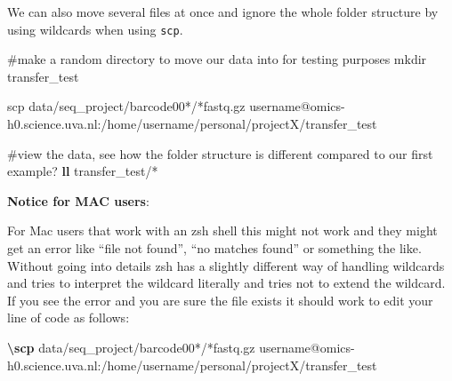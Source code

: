 \documentclass[
  letterpaper,
  DIV=11,
  numbers=noendperiod]{scrreprt}
\newenvironment{Shaded}{}{}
\newcommand{\CommentTok}[1]{\textcolor[rgb]{0.42,0.45,0.49}{#1}}
\newcommand{\ExtensionTok}[1]{\textcolor[rgb]{0.84,0.23,0.29}{\textbf{#1}}}
\newcommand{\FunctionTok}[1]{\textcolor[rgb]{0.44,0.26,0.76}{#1}}
\newcommand{\NormalTok}[1]{\textcolor[rgb]{0.14,0.16,0.18}{#1}}
\newcommand{\PreprocessorTok}[1]{\textcolor[rgb]{0.84,0.23,0.29}{#1}}
\begin{document}
\begin{tcolorbox}[enhanced jigsaw, coltitle=black, leftrule=.75mm, colback=white, toptitle=1mm, breakable, toprule=.15mm, colbacktitle=quarto-callout-tip-color!10!white, bottomtitle=1mm, arc=.35mm, opacitybacktitle=0.6, bottomrule=.15mm, titlerule=0mm, title=\textcolor{quarto-callout-tip-color}{\faLightbulb}\hspace{0.5em}{Tip: moving data from the HPC using wildcards}, rightrule=.15mm, left=2mm, colframe=quarto-callout-tip-color-frame, opacityback=0]

We can also move several files at once and ignore the whole folder
structure by using wildcards when using \texttt{scp}.

\begin{Shaded}
\begin{Highlighting}[]
\CommentTok{\#make a random directory to move our data into for testing purposes}
\FunctionTok{mkdir}\NormalTok{ transfer\_test}

\FunctionTok{scp}\NormalTok{ data/seq\_project/barcode00}\PreprocessorTok{*}\NormalTok{/}\PreprocessorTok{*}\NormalTok{fastq.gz username@omics{-}h0.science.uva.nl:/home/username/personal/projectX/transfer\_test}

\CommentTok{\#view the data, see how the folder structure is different compared to our first example? }
\ExtensionTok{ll}\NormalTok{ transfer\_test/}\PreprocessorTok{*}
\end{Highlighting}
\end{Shaded}

\textbf{Notice for MAC users}:

For Mac users that work with an zsh shell this might not work and they
might get an error like ``file not found'', ``no matches found'' or
something the like. Without going into details zsh has a slightly
different way of handling wildcards and tries to interpret the wildcard
literally and tries not to extend the wildcard. If you see the error and
you are sure the file exists it should work to edit your line of code as
follows:

\begin{Shaded}
\begin{Highlighting}[]
\ExtensionTok{\textbackslash{}scp}\NormalTok{  data/seq\_project/barcode00}\PreprocessorTok{*}\NormalTok{/}\PreprocessorTok{*}\NormalTok{fastq.gz username@omics{-}h0.science.uva.nl:/home/username/personal/projectX/transfer\_test}
\end{Highlighting}
\end{Shaded}


\end{tcolorbox}
\end{document}
